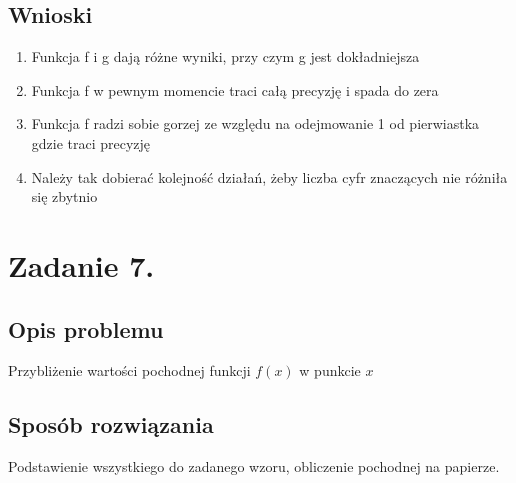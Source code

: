 \documentclass[12pt]{article}
\begin{document}
\subsection{Wnioski}
    \begin{enumerate}
        \item Funkcja f i g dają różne wyniki, przy czym g jest dokładniejsza
        \item Funkcja f w pewnym momencie traci całą precyzję i spada do zera
        \item Funkcja f radzi sobie gorzej ze względu na odejmowanie 1 od pierwiastka\\
        gdzie traci precyzję
        \item Należy tak dobierać kolejność działań, żeby liczba cyfr znaczących nie różniła się zbytnio
    \end{enumerate}
\section{Zadanie 7.}

\subsection{Opis problemu}
Przybliżenie wartości pochodnej funkcji $f(x)$ w punkcie $x$
\subsection{Sposób rozwiązania}
Podstawienie wszystkiego do zadanego wzoru, obliczenie pochodnej na papierze.
\newpage
\end{document}
